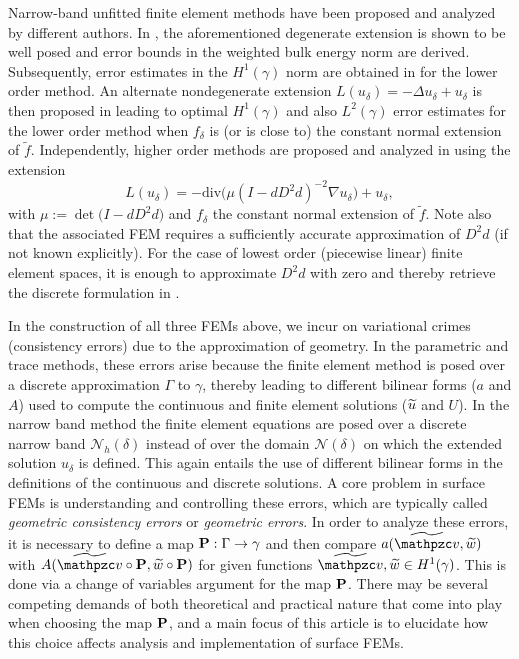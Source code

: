 Narrow-band unfitted finite element methods have been proposed and analyzed by different authors.
In \cite{MR2485787}, the aforementioned degenerate extension is shown to be well posed and error  bounds in the weighted bulk energy norm are derived. Subsequently, error estimates in the $H^1(\gamma)$ norm are obtained in \cite{MR2608464} for the lower order method.
An alternate nondegenerate extension $L(u_\delta) = -\Delta  u_\delta+u_\delta$ is then proposed in \cite{MR3249369} leading to optimal  $H^1(\gamma)$ and also $L^2(\gamma)$ error estimates for the lower order method when $f_\delta$ is  (or is close to) the constant normal extension of $\widetilde f$.
Independently, higher order methods are proposed and analyzed in \cite{MR3471100} using the extension
%
\[
L(u_\delta) = -\textrm{div} \big( \mu (I-dD^2 d)^{-2} \nabla u_\delta \big) + u_\delta,
\]
%
with $\mu := \det \big(I-dD^2 d\big)$ and $f_\delta$ the constant normal extension of $\widetilde f$.
Note also that the associated FEM requires a sufficiently accurate approximation of $D^2d$ (if not known explicitly).
For the case of lowest order (piecewise linear) finite element spaces, it is enough to approximate $D^2d$ with zero and thereby retrieve the discrete formulation in \cite{MR3249369}.


In the construction of all three FEMs above, we incur on variational crimes (consistency errors) due to the approximation of geometry.  In the parametric and trace methods, these errors arise because the finite element method is posed over a discrete approximation $\Gamma$ to $\gamma$, thereby leading to different bilinear forms ($a$ and $A$) used to compute the continuous and finite element solutions ($\widetilde{u}$ and $U$).  In the narrow band method the finite element equations are posed over a discrete narrow band $\mathcal{N}_h(\delta)$ instead of over the domain $\mathcal{N}(\delta)$ on which the extended solution $u_\delta$ is defined.  This again entails the use of different bilinear forms in the definitions of the continuous and discrete solutions.  A core problem in surface FEMs is understanding and controlling these errors, which are typically called {\it geometric consistency errors} or {\it geometric errors}.   In order to analyze these errors, it is necessary to define a map ${\bf P}:\Gamma \rightarrow \gamma$ and then compare $a(\widetilde \tv, \widetilde w)$ with $A(\widetilde \tv \circ \bP, \widetilde w \circ \bP)$ for given functions $\widetilde \tv, \widetilde w \in H^1(\gamma)$.  This is done via a change of variables argument for the map ${\bf P}$.  There may be several competing demands of both theoretical and practical nature that come into play when choosing the map ${\bf P}$, and a main focus of this article is to elucidate how this choice affects analysis and implementation of surface FEMs.  

